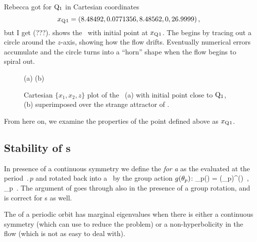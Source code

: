 Rebecca got for
$\mathrm{Q}_{1}$ in Cartesian coordinates
\[x_{\mathrm{Q}_{}1} = (8.48492,0.0771356,8.48562,0,26.9999)
\,,
\]
but I get (???).
 shows the \cLf\ with initial point at
$x_{\mathrm{Q}_{}1}$. The {\reqv} begins by tracing out a circle
around the $z$-axis, showing how the flow drifts. Eventually
numerical errors accumulate and the circle turns into a
``horn'' shape when the flow begins to spiral out.
\begin{figure}[h]
\begin{center}
(a) %
(b) %
\end{center}
\caption{
Cartesian $\{x_1,x_2,z\}$ plot of the \cLf\ (a) with initial point
close to $\mathrm{Q}_{1}$, (b) superimposed over the strange attractor of
.
    }
\label{fig:CLERelEqui}
\end{figure}

From here on, we examine the properties of the point defined above as
$x_{\mathrm{Q}_{}1}$.

\subsection{Stability of \rpo s}
\label{SF:rpos}

In presence of a continuous symmetry we define the
\emph{{\FloquetM} for a \rpo} as the {\jacobianM} evaluated
at the period $\period{p}$ and rotated back into a \po\ by the
group action $g({\bf \theta}_p)$:
     \toCB
\beq
 \jMps_p(\ssp) = \LieEl(\gSpace_p)\jMps^(\ssp)
    \,,\qquad
\ssp  \in \pS_p
\,.
The argument of  goes through also in
the presence of a group rotation,
and  is correct for \rpo s as well.


The {\jacobianM} of a periodic orbit has marginal eigenvalues
when there is either a continuous symmetry (which can use to
reduce the problem) or a non-hyperbolicity in the flow (which
is not as easy to deal with).

